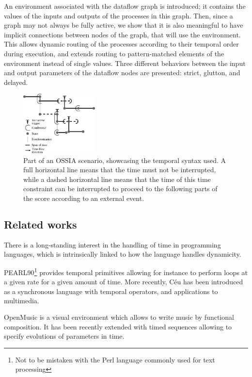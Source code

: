 \documentclass{article}
\begin{document}
An environment associated with the dataflow graph is introduced; it contains the values of the inputs and outputs of the processes in this graph.
Then, since a graph may not always be fully active, we show that it is also meaningful to have implicit connections between nodes of the graph, that will use the environment.
This allows dynamic routing of the processes according to their temporal order during execution, and extends routing to pattern-matched elements of the environment instead of single values.
Three different behaviors between the input and output parameters of the dataflow nodes are presented: strict, glutton, and delayed. 

\begin{figure} [h]
	\centering
	\includegraphics[width=0.35\textwidth]{images/iscore-example.eps}
	\caption{Part of an OSSIA scenario, showcasing the temporal syntax used. 
		A full horizontal line means that the time must not be interrupted, 
		while a dashed horizontal line means that the time of this time constraint can be interrupted to proceed 
		to the following parts of the score according to an external event.}
	\label{fig.iscore-example}
\end{figure}

\subsection{Related works}
There is a long-standing interest in the handling of time in programming languages, which is intrinsically linked to how the language handles dynamicity.

PEARL90\cite{halang2001safe}\footnote{Not to be mistaken with the Perl language commonly used for text processing} provides temporal primitives allowing for instance to perform loops at a given rate for a given amount of time.
More recently, Céu has been introduced as a synchronous language with temporal operators, and applications to multimedia\cite{Santos:2016:CLI:2976796.2976856}.

OpenMusic is a visual environment which allows to write music by functional composition.
It has been recently extended with timed sequences allowing to specify evolutions of parameters in time\cite{garcia:hal-01484077}.
\end{document}

